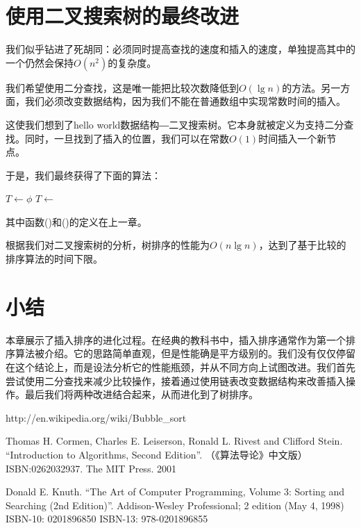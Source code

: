 \documentclass[UTF8]{article}
\begin{document}

\section{使用二叉搜索树的最终改进}

我们似乎钻进了死胡同：必须同时提高查找的速度和插入的速度，单独提高其中的一个仍然会保持$O(n^2)$的复杂度。

我们希望使用二分查找，这是唯一能把比较次数降低到$O(\lg n)$的方法。另一方面，我们必须改变数据结构，因为我们不能在普通数组中实现常数时间的插入。

这使我们想到了hello world数据结构―二叉搜索树。它本身就被定义为支持二分查找。同时，一旦找到了插入的位置，我们可以在常数$O(1)$时间插入一个新节点。

于是，我们最终获得了下面的算法：

\begin{algorithmic}
  \State $T \gets \phi$
    \State $T \gets $ 
  \EndFor
  \State \Return {}
\EndFunction
\end{algorithmic}

其中函数()和()的定义在上一章。

根据我们对二叉搜索树的分析，树排序的性能为$O(n \lg n)$，达到了基于比较的排序算法的时间下限\cite{Knuth}。

\section{小结}
本章展示了插入排序的进化过程。在经典的教科书中，插入排序通常作为第一个排序算法被介绍。它的思路简单直观，但是性能确是平方级别的。我们没有仅仅停留在这个结论上，而是设法分析它的性能瓶颈，并从不同方向上试图改进。我们首先尝试使用二分查找来减少比较操作，接着通过使用链表改变数据结构来改善插入操作。最后我们将两种改进结合起来，从而进化到了树排序。

\begin{thebibliography}{99}

http://en.wikipedia.org/wiki/Bubble\_sort

Thomas H. Cormen, Charles E. Leiserson, Ronald L. Rivest and Clifford Stein.
``Introduction to Algorithms, Second Edition''. （《算法导论》中文版）ISBN:0262032937. The MIT Press. 2001

Donald E. Knuth. ``The Art of Computer Programming, Volume 3: Sorting and Searching (2nd Edition)''. Addison-Wesley Professional; 2 edition (May 4, 1998) ISBN-10: 0201896850 ISBN-13: 978-0201896855

\end{thebibliography}

\ifx\wholebook\relax\else
\end{document}
